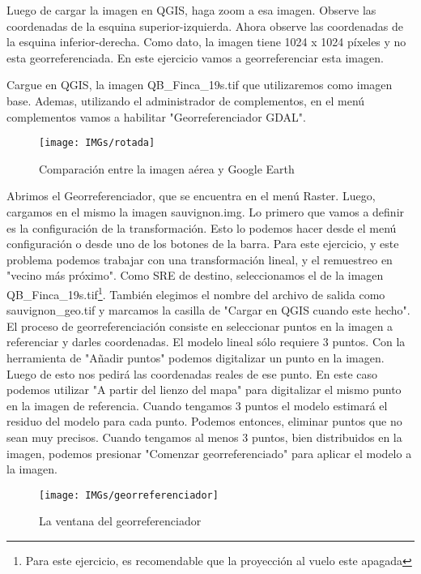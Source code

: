 \documentclass[onecolumn]{article}
\begin{document}
Luego de cargar la imagen en QGIS, haga zoom a esa imagen. Observe las coordenadas de la esquina superior-izquierda. Ahora observe las coordenadas de la esquina inferior-derecha. Como dato, la imagen tiene 1024 x 1024 píxeles y no esta georreferenciada. En este ejercicio vamos a georreferenciar esta imagen.

Cargue en QGIS, la imagen QB\_Finca\_19s.tif que utilizaremos como imagen base. Ademas, utilizando el administrador de complementos, en el menú complementos vamos a habilitar "Georreferenciador GDAL".

\begin{figure}[h]
	\centering
	\texttt{[image: IMGs/rotada]}
	\caption{Comparación entre la imagen aérea y Google Earth}
	\label{fig:rotada}
\end{figure}

Abrimos el Georreferenciador, que se encuentra en el menú Raster. Luego, cargamos en el mismo la imagen sauvignon.img. Lo primero que vamos a definir es la configuración de la transformación. Esto lo podemos hacer desde el menú configuración o desde uno de los botones de la barra. Para este ejercicio, y este problema podemos trabajar con una transformación lineal, y el remuestreo en "vecino más próximo". Como SRE de destino, seleccionamos el de la imagen QB\_Finca\_19s.tif\footnote{Para este ejercicio, es recomendable que la proyección al vuelo este apagada}. También elegimos el nombre del archivo de salida como sauvignon\_geo.tif y marcamos la casilla de "Cargar en QGIS cuando este hecho".\\

El proceso de georreferenciación consiste en seleccionar puntos en la imagen a referenciar y darles coordenadas. El modelo lineal sólo requiere 3 puntos. Con la herramienta de "Añadir puntos" podemos digitalizar un punto en la imagen. Luego de esto nos pedirá las coordenadas reales de ese punto. En este caso podemos utilizar "A partir del lienzo del mapa" para digitalizar el mismo punto en la imagen de referencia. Cuando tengamos 3 puntos el modelo estimará el residuo del modelo para cada punto. Podemos entonces, eliminar puntos que no sean muy precisos. Cuando tengamos al menos 3 puntos, bien distribuidos en la imagen, podemos presionar "Comenzar georreferenciado" para aplicar el modelo a la imagen.

\begin{figure}[h]
	\centering
	\texttt{[image: IMGs/georreferenciador]}
	\caption{La ventana del georreferenciador}
	\label{fig:rotada}
\end{figure}
\end{document}
